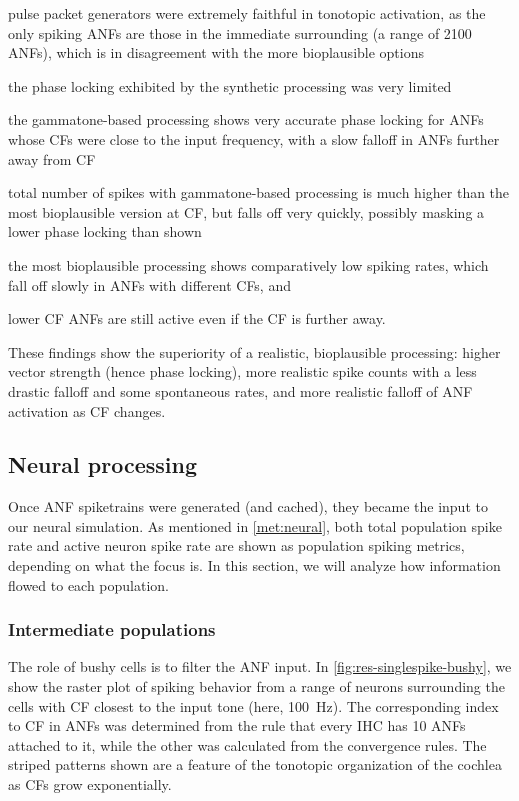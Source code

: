 \documentclass[11pt,a4paper]{article}
\begin{document}
\begin{inlinelist}
    \item pulse packet generators were extremely faithful in tonotopic activation, as the only spiking ANFs are those in the immediate surrounding (a range of 2100 ANFs), which is in disagreement with the more bioplausible options
    \item the phase locking exhibited by the synthetic processing was very limited
    \item\label{vs:gamm} the gammatone-based processing shows very accurate phase locking for ANFs whose CFs were close to the input frequency, with a slow falloff in ANFs further away from CF
    \item total number of spikes with gammatone-based processing is much higher than the most bioplausible version at CF, but falls off very quickly, possibly masking a lower phase locking than shown
    \item the most bioplausible processing shows comparatively low spiking rates, which fall off slowly in ANFs with different CFs, and 
    \item\label{vs:tclowfreq} lower CF ANFs are still active even if the CF is further away.
\end{inlinelist}
These findings show the superiority of a realistic, bioplausible processing: higher vector strength (hence phase locking), more realistic spike counts with a less drastic falloff and some spontaneous rates, and more realistic falloff of ANF activation as CF changes.

\subsection{Neural processing}
Once ANF spiketrains were generated (and cached), they became the input to our neural simulation. As mentioned in \ref{met:neural}, both total population spike rate and active neuron spike rate are shown as population spiking metrics, depending on what the focus is. In this section, we will analyze how information flowed to each population.

\subsubsection{Intermediate populations}
The role of bushy cells is to filter the ANF input. In \ref{fig:res-singlespike-bushy}, we show the raster plot of spiking behavior from a range of neurons surrounding the cells with CF closest to the input tone (here, \qty{100}{\hertz}). The corresponding index to CF in ANFs was determined from the rule that every IHC has 10 ANFs attached to it, while the other was calculated from the convergence rules. The striped patterns shown are a feature of the tonotopic organization of the cochlea as CFs grow exponentially.
\end{document}

